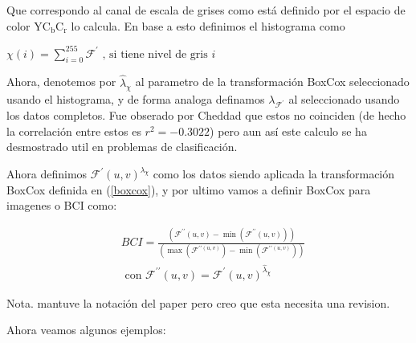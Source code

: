     Que correspondo al canal de escala de grises como est\'a definido por el espacio de color $\mathrm{YC}_{\mathrm{b}} \mathrm{C}_{\mathrm{r}}$ lo calcula. En base a esto definimos el histograma como
    
    $\chi(i)=\sum_{i=0}^{255}\mathcal{F}^{\prime} \text{ , si tiene nivel de gris } i$ 
    
    Ahora, denotemos por $\hat{\lambda}_{\chi}$ al parametro de la transformaci\'on BoxCox seleccionado usando el histograma, y de forma analoga definamos $\lambda_{\mathcal{F}^{\prime}}$ al seleccionado usando los datos completos. Fue obserado por Cheddad que estos no coinciden (de hecho la correlaci\'on entre estos es $r^2=-0.3022$) pero aun as\'i este calculo se ha desmostrado util en problemas de clasificaci\'on.


    Ahora definimos $\mathcal{F}^{\prime}(u, v)^{\lambda_{\chi}}$ como los datos siendo aplicada la transformaci\'on BoxCox definida en (\ref{boxcox}), y por ultimo vamos a definir BoxCox para imagenes o BCI como:

    $$    
    \begin{aligned}
        &B C I=\frac{\left(\mathcal{F}^{\prime \prime}(u, v)-\min \left(\mathcal{F}^{\prime \prime}(u, v)\right)\right)}{\left(\max \left(\mathcal{F}^{\prime \prime(u, v)}\right)-\min \left(\mathcal{F}^{\prime \prime(u, v)}\right)\right)}\\
        &\text { con } \mathcal{F}^{\prime \prime}(u, v)=\mathcal{F}^{\prime}(u, v)^{\hat{\lambda}_{\chi}}
    \end{aligned}
    $$
    
    Nota. mantuve la notaci\'on del paper pero creo que esta necesita una revision.

    Ahora veamos algunos ejemplos: